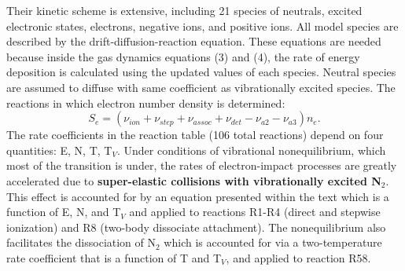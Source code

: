 \documentclass[]{article}
\begin{document}
	Their kinetic scheme is extensive, including 21 species of neutrals, excited electronic states, electrons, negative ions, and positive ions. All model species are described by the drift-diffusion-reaction equation. These equations are needed because inside the gas dynamics equations (3) and (4), the rate of energy deposition is calculated using the updated values of each species. Neutral species are assumed to diffuse with same coefficient as vibrationally excited species. The reactions in which electron number density is determined:
	\[ S_e = (\nu_{ion} + \nu_{step} + \nu_{assoc} + \nu_{det} - \nu_{a2} - \nu_{a3})n_e.\]
	The rate coefficients in the reaction table (106 total reactions) depend on four quantities: E, N, T, T$_V$. Under conditions of vibrational nonequilibrium, which most of the transition is under, the rates of electron-impact processes are greatly accelerated due to \textbf{super-elastic collisions with vibrationally excited N$_2$}. This effect is accounted for by an equation presented within the text which is a function of E, N, and T$_V$ and applied to reactions R1-R4 (direct and stepwise ionization) and R8 (two-body dissociate attachment). The nonequilibrium also facilitates the dissociation of N$_2$ which is accounted for via a two-temperature rate coefficient that is a function of T and T$_V$, and applied to reaction R58.
	
\end{document}
